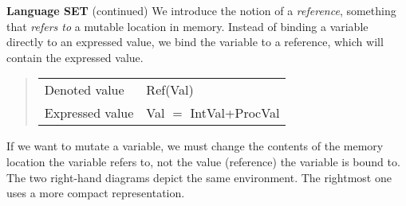 \begin{minipage}[t]{\sw}
\slidenumber
\LARGE
{\bf Language SET} (continued)\exx
We introduce the notion of a {\em reference},
something that {\em refers to} a mutable location in memory.
Instead of binding a variable directly to an expressed value,
we bind the variable to a reference,
which will contain the expressed value.\\
\begin{quote}
\begin{tabular}{@{}l@{ $=$ }l}
Denoted value & Ref(Val) \\
Expressed value & Val $=$ IntVal+ProcVal \\
\end{tabular}
\end{quote}
If we want to mutate a variable,
we must change the contents of the memory location
the variable refers to,
not the value (reference) the variable is bound to.
\vspace{2ex}
The two right-hand diagrams depict the same environment.
The rightmost one uses a more compact representation.
\end{minipage}
